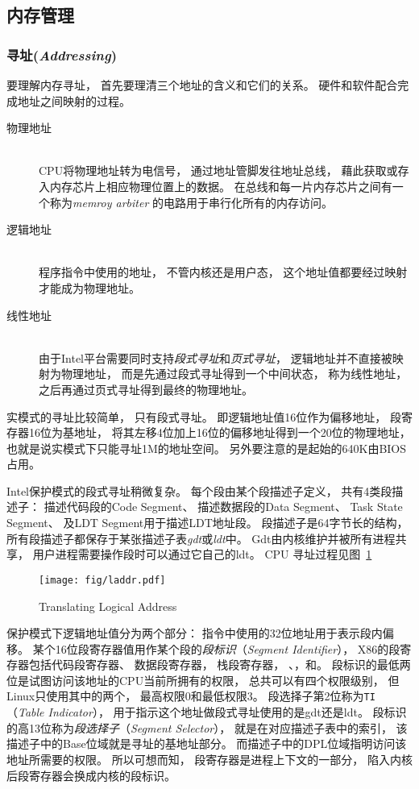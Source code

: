 \subsection{内存管理}

\subsubsection{寻址(\emph{Addressing})}
要理解内存寻址，
首先要理清三个地址的含义和它们的关系。
硬件和软件配合完成地址之间映射的过程。
\begin{description}
\item[物理地址] \hfill\\
  CPU将物理地址转为电信号，
  通过地址管脚发往地址总线，
  藉此获取或存入内存芯片上相应物理位置上的数据。
  在总线和每一片内存芯片之间有一个称为{\em memroy arbiter}
  的电路用于串行化所有的内存访问。
\item[逻辑地址] \hfill\\
  程序指令中使用的地址，
  不管内核还是用户态，
  这个地址值都要经过映射才能成为物理地址。
\item[线性地址] \hfill\\
  由于Intel平台需要同时支持{\em 段式寻址}和{\em 页式寻址}，
  逻辑地址并不直接被映射为物理地址，
  而是先通过段式寻址得到一个中间状态，
  称为线性地址，
  之后再通过页式寻址得到最终的物理地址。
\end{description}
实模式的寻址比较简单，
只有段式寻址。
即逻辑地址值16位作为偏移地址，
段寄存器16位为基地址，
将其左移4位加上16位的偏移地址得到一个20位的物理地址，
也就是说实模式下只能寻址1M的地址空间。
另外要注意的是起始的640K由BIOS占用。

Intel保护模式的段式寻址稍微复杂。
每个段由某个段描述子定义，
共有4类段描述子：
描述代码段的Code Segment、
描述数据段的Data Segment、
Task State Segment、
及LDT Segment用于描述LDT地址段。
段描述子是64字节长的结构，
所有段描述子都保存于某张描述子表{\em gdt}或{\em ldt}中。
Gdt由内核维护并被所有进程共享，
用户进程需要操作段时可以通过它自己的ldt。
CPU 寻址过程见图~\ref{fig:laddr}

\begin{figure}[!ht]
  \centering
  \texttt{[image: fig/laddr.pdf]}
  \caption{Translating Logical Address}\label{fig:laddr}
\end{figure}

保护模式下逻辑地址值分为两个部分：
指令中使用的32位地址用于表示段内偏移。
某个16位段寄存器值用作某个段的{\em 段标识}（{\em Segment Identifier}），
X86的段寄存器包括代码段寄存器、
数据段寄存器，
栈段寄存器，
、，和。
段标识的最低两位是试图访问该地址的CPU当前所拥有的权限，
总共可以有四个权限级别，
但Linux只使用其中的两个，
最高权限0和最低权限3。
段选择子第2位称为\verb|TI|（{\em Table Indicator}），
用于指示这个地址做段式寻址使用的是gdt还是ldt。
段标识的高13位称为{\em 段选择子}（{\em Segment Selector}），
就是在对应描述子表中的索引，
该描述子中的Base位域就是寻址的基地址部分。
而描述子中的DPL位域指明访问该地址所需要的权限。
所以可想而知，
段寄存器是进程上下文的一部分，
陷入内核后段寄存器会换成内核的段标识。

